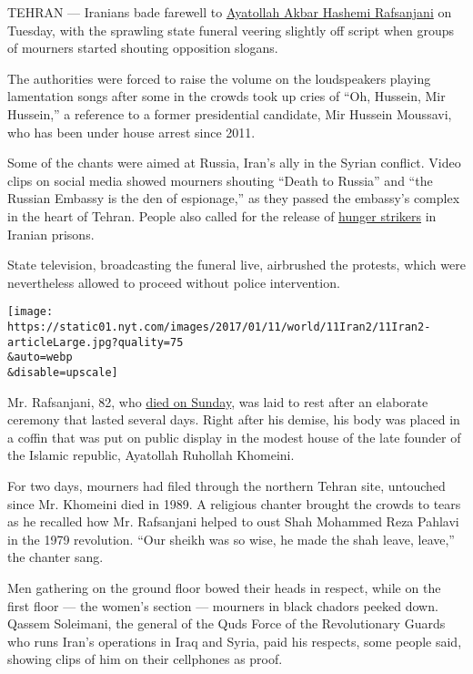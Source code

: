 TEHRAN --- Iranians bade farewell to
\href{http://www.nytimes.com/2017/01/08/world/middleeast/ayatollah-rafsanjani-dead.html}{Ayatollah
Akbar Hashemi Rafsanjani} on Tuesday, with the sprawling state funeral
veering slightly off script when groups of mourners started shouting
opposition slogans.

The authorities were forced to raise the volume on the loudspeakers
playing lamentation songs after some in the crowds took up cries of
``Oh, Hussein, Mir Hussein,'' a reference to a former presidential
candidate, Mir Hussein Moussavi, who has been under house arrest since
2011.

Some of the chants were aimed at Russia, Iran's ally in the Syrian
conflict. Video clips on social media showed mourners shouting ``Death
to Russia'' and ``the Russian Embassy is the den of espionage,'' as they
passed the embassy's complex in the heart of Tehran. People also called
for the release of
\href{http://www.nytimes.com/2017/01/09/world/middleeast/the-hunger-strike-the-protest-tactic-of-gandhi-is-vexing-irans-penal-overseers.html?ref=world}{hunger
strikers} in Iranian prisons.

State television, broadcasting the funeral live, airbrushed the
protests, which were nevertheless allowed to proceed without police
intervention.

\texttt{[image: https://static01.nyt.com/images/2017/01/11/world/11Iran2/11Iran2-articleLarge.jpg?quality=75\\\&auto=webp\\\&disable=upscale]}

Mr. Rafsanjani, 82, who
\href{http://www.nytimes.com/2017/01/08/world/middleeast/iran-ali-akbar-hashemi-rafsanjani-dies.html}{died
on Sunday}, was laid to rest after an elaborate ceremony that lasted
several days. Right after his demise, his body was placed in a coffin
that was put on public display in the modest house of the late founder
of the Islamic republic, Ayatollah Ruhollah Khomeini.

For two days, mourners had filed through the northern Tehran site,
untouched since Mr. Khomeini died in 1989. A religious chanter brought
the crowds to tears as he recalled how Mr. Rafsanjani helped to oust
Shah Mohammed Reza Pahlavi in the 1979 revolution. ``Our sheikh was so
wise, he made the shah leave, leave,'' the chanter sang.

Men gathering on the ground floor bowed their heads in respect, while on
the first floor --- the women's section --- mourners in black chadors
peeked down. Qassem Soleimani, the general of the Quds Force of the
Revolutionary Guards who runs Iran's operations in Iraq and Syria, paid
his respects, some people said, showing clips of him on their cellphones
as proof.

